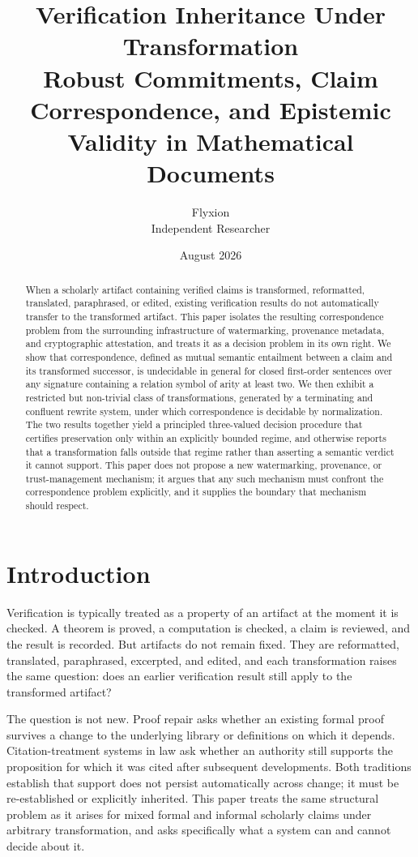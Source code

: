 \documentclass[11pt]{article}
\title{Verification Inheritance Under Transformation \\
\large Robust Commitments, Claim Correspondence, and Epistemic Validity in Mathematical Documents}
\author{Flyxion \\ \small Independent Researcher}
\date{August 2026}
\begin{document}
\maketitle

\begin{abstract}
When a scholarly artifact containing verified claims is transformed, reformatted, translated, paraphrased, or edited, existing verification results do not automatically transfer to the transformed artifact. This paper isolates the resulting correspondence problem from the surrounding infrastructure of watermarking, provenance metadata, and cryptographic attestation, and treats it as a decision problem in its own right. We show that correspondence, defined as mutual semantic entailment between a claim and its transformed successor, is undecidable in general for closed first-order sentences over any signature containing a relation symbol of arity at least two. We then exhibit a restricted but non-trivial class of transformations, generated by a terminating and confluent rewrite system, under which correspondence is decidable by normalization. The two results together yield a principled three-valued decision procedure that certifies preservation only within an explicitly bounded regime, and otherwise reports that a transformation falls outside that regime rather than asserting a semantic verdict it cannot support. This paper does not propose a new watermarking, provenance, or trust-management mechanism; it argues that any such mechanism must confront the correspondence problem explicitly, and it supplies the boundary that mechanism should respect.
\end{abstract}

\section{Introduction}

Verification is typically treated as a property of an artifact at the moment it is checked. A theorem is proved, a computation is checked, a claim is reviewed, and the result is recorded. But artifacts do not remain fixed. They are reformatted, translated, paraphrased, excerpted, and edited, and each transformation raises the same question: does an earlier verification result still apply to the transformed artifact?

The question is not new. Proof repair asks whether an existing formal proof survives a change to the underlying library or definitions on which it depends. Citation-treatment systems in law ask whether an authority still supports the proposition for which it was cited after subsequent developments. Both traditions establish that support does not persist automatically across change; it must be re-established or explicitly inherited. This paper treats the same structural problem as it arises for mixed formal and informal scholarly claims under arbitrary transformation, and asks specifically what a system can and cannot decide about it.
\end{document}
